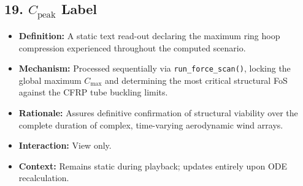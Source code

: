 \documentclass[11pt,a4paper]{article}
\begin{document}
\subsection{19. $C_{\text{peak}}$ Label}
\begin{itemize}
    \item \textbf{Definition:} A static text read-out declaring the maximum ring hoop compression experienced throughout the computed scenario.
    \item \textbf{Mechanism:} Processed sequentially via \texttt{run\_force\_scan()}, locking the global maximum $C_{\text{max}}$ and determining the most critical structural FoS against the CFRP tube buckling limits.
    \item \textbf{Rationale:} Assures definitive confirmation of structural viability over the complete duration of complex, time-varying aerodynamic wind arrays.
    \item \textbf{Interaction:} View only.
    \item \textbf{Context:} Remains static during playback; updates entirely upon ODE recalculation.
\end{itemize}
\end{document}
